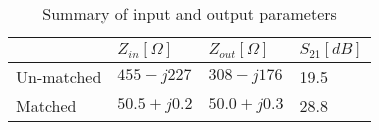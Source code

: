 \documentclass[report.tex]{subfiles}
\begin{document}
\begin{table}
    \centering
    \caption{Summary of input and output parameters}
    \begin{tabular}{l | l l l}
        & $Z_{in} [\Omega]$ & $Z_{out} [\Omega]$ & $S_{21} [dB]$\\
        \hline
        Un-matched & $455-j227$  & $308-j176$  & 19.5 \\
        Matched    & $50.5+j0.2$ & $50.0+j0.3$ & 28.8 \\
    \end{tabular}
\end{table}

\clearpage
\end{document}
